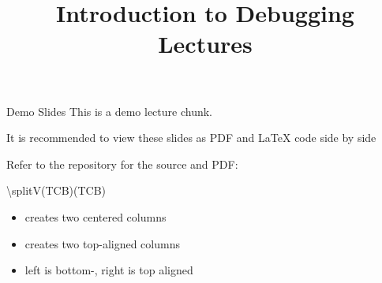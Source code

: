 \documentclass[11pt,compress,t,notes=noshow, xcolor=table]{beamer}
\title{Introduction to Debugging Lectures}
\begin{document}

\begin{frame}{Demo Slides}
  This is a demo lecture chunk.
  
  It is recommended to view these slides as PDF and LaTeX code side by side
  
  Refer to the  repository for the source and PDF:
  \begin{itemizeS}
    \item \href{https://slds-lmu.github.io/lecture_debug/lecture_debug/slides/demo/slides-demo-layout.pdf}{}
    \item \href{https://github.com/slds-lmu/lecture_debug/blob/main/slides/demo/slides-demo-layout.tex}{}
  \end{itemizeS}
  
\end{frame}

\begin{frame}{\textbackslash splitV(TCB)(TCB)}
  
  \begin{itemize}
    \item {} creates two centered columns
    \item {} creates two top-aligned columns 
    \item {} left is bottom-, right is top aligned
    
  \end{itemize}
  
  \vfill
  
  
  \vfill
  
  
\end{frame}
\end{document}
